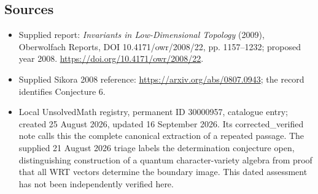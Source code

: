 \documentclass[11pt]{article}
\begin{document}
\subsection{Sources}
\begin{itemize}
\item Supplied report: \emph{Invariants in Low-Dimensional Topology} (2009), Oberwolfach Reports, DOI 10.4171/owr/2008/22, pp. 1157--1232; proposed year 2008. \url{https://doi.org/10.4171/owr/2008/22}.
\item Supplied Sikora 2008 reference: \url{https://arxiv.org/abs/0807.0943}; the record identifies Conjecture 6.
\item Local UnsolvedMath registry, permanent ID 30000957, catalogue entry; created 25 August 2026, updated 16 September 2026. Its corrected\_verified note calls this the complete canonical extraction of a repeated passage. The supplied 21 August 2026 triage labels the determination conjecture open, distinguishing construction of a quantum character-variety algebra from proof that all WRT vectors determine the boundary image. This dated assessment has not been independently verified here.
\end{itemize}
\end{document}
